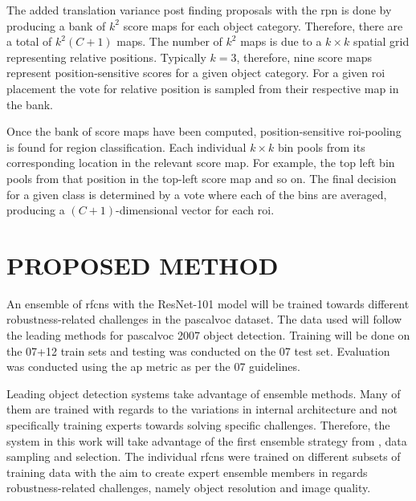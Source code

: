 \documentclass[a4paper,twoside]{article}
\begin{document}
\begin{comment}
    \begin{figure}[H]
      \centering
        \texttt{[image: Figs/rfcnarchi.png]}
          \caption{Architecture of \gls{rfcn}. Region proposals are found using the \gls{rpn} followed by classification based on a bank of position-sensitive score maps \cite{rfcn}.}
        \label{fig:rfcnarch}
\end{figure}
\end{comment}

The added translation variance post finding proposals with the \gls{rpn} is done by producing a bank of $k^2$ score maps for each object category. Therefore, there are a total of $k^2(C + 1)$ maps. The number of $k^2$ maps is due to a $k \times k$ spatial grid representing relative positions. Typically $k = 3$, therefore, nine score maps represent position-sensitive scores for a given object category. For a given \gls{roi} placement the vote for relative position is sampled from their respective map in the bank.

Once the bank of score maps have been computed, position-sensitive \gls{roi}-pooling is found for region classification. Each individual $k \times k$ bin pools from its corresponding location in the relevant score map. For example, the top left bin pools from that position in the top-left score map and so on. The final decision for a given class is determined by a vote where each of the bins are averaged, producing a $(C+1)$-dimensional vector for each \gls{roi}.

\section{\uppercase{Proposed Method}}
An ensemble of \glspl{rfcn} with the ResNet-101 model will be trained towards different robustness-related challenges in the \gls{pascalvoc} dataset. The data used will follow the leading methods for \gls{pascalvoc} 2007 object detection. Training will be done on the 07+12 train sets and testing was conducted on the 07 test set. Evaluation was conducted using the \gls{ap} metric as per the 07 guidelines.

Leading object detection systems take advantage of ensemble methods. Many of them are trained with regards to the variations in internal architecture and not specifically training experts towards solving specific challenges. Therefore, the system in this work will take advantage of the first ensemble strategy from \cite{zhang}, data sampling and selection. The individual \glspl{rfcn} were trained on different subsets of training data with the aim to create expert ensemble members in regards robustness-related challenges, namely object resolution and image quality. 
\end{document}
